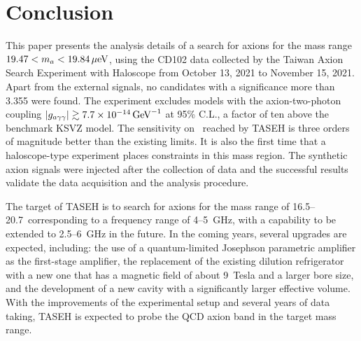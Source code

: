 \section{Conclusion} \label{sec:conclusion}
This paper presents the analysis details of a search for axions for the mass 
range $19.47 < m_a < 19.84 \,\mu\text{e\hspace{-.08em}V}$, using the CD102 data collected by the 
Taiwan Axion Search Experiment with Haloscope from October 13, 2021 
to November 15, 2021. 
Apart from the external signals, no candidates with a significance more than
3.355 were found. The experiment excludes models with the 
axion-two-photon coupling $\left|g_{a\gamma\gamma}\right|\gtrsim 7.7\times 10^{-14}\,\text{Ge\hspace{-.08em}V}^{-1}$ at 95\% C.L.,
 a factor of ten 
above the benchmark KSVZ model. The sensitivity on \gagg\ reached by TASEH 
is three orders of magnitude better than the existing limits. 
It is also the first time that a haloscope-type experiment places 
constraints in this mass region. The synthetic 
axion signals were injected after the collection of data and the 
successful results validate the data acquisition and the analysis procedure. 

The target of TASEH is to search for axions for the mass range of 
16.5--20.7\muevcc\ corresponding to a frequency range of 4--5~GHz, with a 
capability to be extended to 2.5--6~GHz in the future. 
In the coming years, several upgrades are expected, including: the use of a 
quantum-limited Josephson parametric amplifier as the first-stage amplifier, 
the replacement of the existing dilution refrigerator with a new one that has 
a magnetic field of about 9~Tesla and a larger bore size, and the development 
of a new cavity with a significantly larger effective volume. %
With the improvements of the experimental setup and several years of data 
taking, TASEH is expected to probe the QCD axion band in the target mass range.


